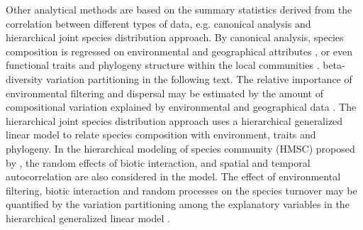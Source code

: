 Other analytical methods are based on the summary statistics derived from the correlation between different types of data, e.g. canonical analysis and hierarchical joint species distribution approach. By canonical analysis, species composition is regressed on environmental and geographical attributes \citep{borcard1992partialling}, or even functional traits and phylogeny structure within the local communities \citep{sirbu2021variation}. \DIFdelbegin {}\DIFdelend \DIFaddbegin {}\DIFaddend beta-diversity variation partitioning in the following text. The relative importance of environmental filtering and dispersal may be estimated by the amount of compositional variation explained by environmental and geographical data \citep{cottenie2005integrating}. The hierarchical joint species distribution approach uses a hierarchical generalized linear model to relate species composition with environment, traits and phylogeny. In the hierarchical modeling of species community (HMSC) proposed by \citet{ovaskainen2017make}, the random effects of biotic interaction, and spatial and temporal autocorrelation are also considered in the model. The effect of environmental filtering, biotic interaction and random processes on the species turnover may be quantified by the variation partitioning among the explanatory variables in the hierarchical generalized linear model \citep{ovaskainen2017make}.


